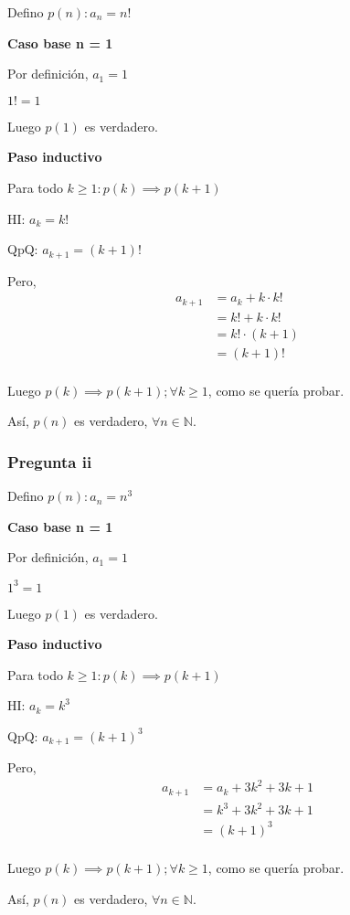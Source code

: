 Defino $ p(n): a_n = n! $

\textbf{Caso base n = 1}

Por definición, $a_1 = 1$

$ 1! = 1 $

Luego $ p(1) $ es verdadero.

\textbf{Paso inductivo}

Para todo $k \geq 1: p(k) \implies p(k+1)$

HI: $ a_k = k!$

QpQ: $ a_{k+1} = (k+1)!$

Pero,
\begin{align*}
    a_{k+1} &= a_k + k\cdot k! \\
    &= k! + k\cdot k! \\
    &= k! \cdot (k+1) \\
    &= (k+1)! \\
\end{align*}

Luego $p(k) \implies p(k+1); \forall k \geq 1$, como se quería probar.

Así, $p(n)$ es verdadero, $\forall n \in \mathbb{N}$.

\subsubsection{Pregunta ii}

Defino $ p(n): a_n = n^3 $

\textbf{Caso base n = 1}

Por definición, $a_1 = 1$

$ 1^3 = 1 $

Luego $ p(1) $ es verdadero.

\textbf{Paso inductivo}

Para todo $k \geq 1: p(k) \implies p(k+1)$

HI: $ a_k = k^3 $

QpQ: $ a_{k+1} = (k+1)^3$

Pero,
\begin{align*}
    a_{k+1} &= a_k + 3k^2 + 3k + 1 \\
    &= k^3 + 3k^2 + 3k + 1 \\
    &= (k+1)^3 \\
\end{align*}

Luego $p(k) \implies p(k+1); \forall k \geq 1$, como se quería probar.

Así, $p(n)$ es verdadero, $\forall n \in \mathbb{N}$.


